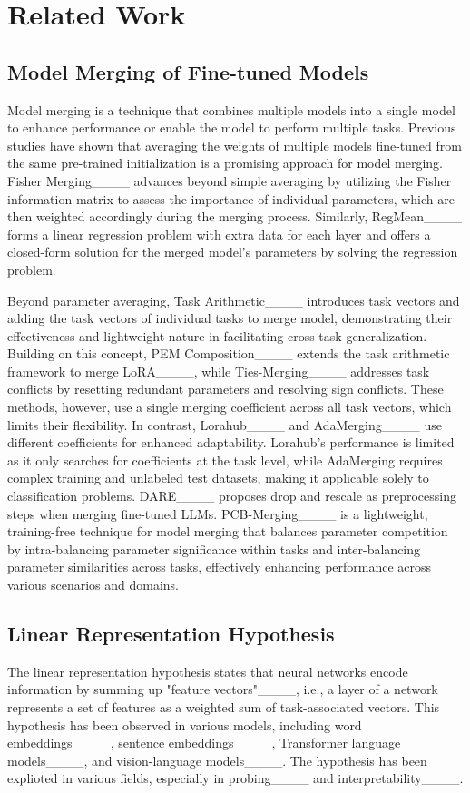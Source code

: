 \section{Related Work}
\subsection{Model Merging of Fine-tuned Models}
Model merging is a technique that combines multiple models into a single model to enhance performance or enable the model to perform multiple tasks. 
Previous studies have shown that averaging the weights of multiple models fine-tuned from the same pre-trained initialization is a promising approach for model merging. 
Fisher Merging____ advances beyond simple averaging by utilizing the Fisher information matrix to assess the importance of individual parameters, which are then weighted accordingly during the merging process. Similarly, RegMean____ forms a linear regression problem with extra data for each layer and offers a closed-form solution for the merged model's parameters by solving the regression problem.


Beyond parameter averaging, Task Arithmetic____ introduces task vectors and adding the task vectors of individual tasks to merge model, demonstrating their effectiveness and lightweight nature in facilitating cross-task generalization. Building on this concept, PEM Composition____ extends the task arithmetic framework to merge LoRA____, while Ties-Merging____ addresses task conflicts by resetting redundant parameters and resolving sign conflicts. These methods, however, use a single merging coefficient across all task vectors, which limits their flexibility. In contrast, Lorahub____ and AdaMerging____ use different coefficients for enhanced adaptability. Lorahub's performance is limited as it only searches for coefficients at the task level, while AdaMerging requires complex training and unlabeled test datasets, making it applicable solely to classification problems. DARE____ proposes drop and rescale as preprocessing steps when merging fine-tuned LLMs. PCB-Merging____ is a lightweight, training-free technique for model merging that balances parameter competition by intra-balancing parameter significance within tasks and inter-balancing parameter similarities across tasks, effectively enhancing performance across various scenarios and domains.


\subsection{Linear Representation Hypothesis}
The linear representation hypothesis states that neural networks encode information by summing up "feature vectors"____, i.e., a layer of a network represents a set of features as a weighted sum of 
task-associated vectors.
This hypothesis has been observed in various models, including word embeddings____, sentence embeddings____, Transformer language models____, and vision-language models____.
The hypothesis has been explioted in various fields, especially in probing____ and interpretability____.

